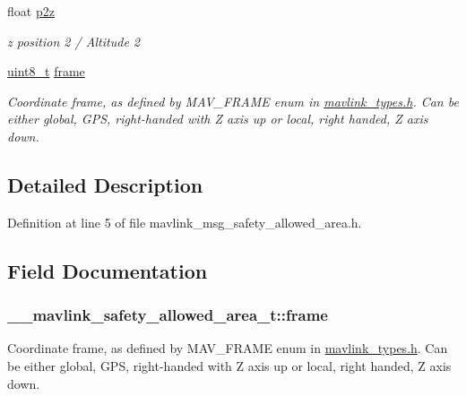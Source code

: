 \begin{DoxyCompactItemize}
float \hyperlink{struct____mavlink__safety__allowed__area__t_a9af8420ae1c69890ec5dfafd54785d91}{p2z}
\begin{DoxyCompactList}\small\item\em z position 2 / Altitude 2 \end{DoxyCompactList}\item 
\hyperlink{stdint_8h_aba7bc1797add20fe3efdf37ced1182c5}{uint8\-\_\-t} \hyperlink{struct____mavlink__safety__allowed__area__t_a8b809d2612e4c0ccb4a7d89841fa509c}{frame}
\begin{DoxyCompactList}\small\item\em Coordinate frame, as defined by M\-A\-V\-\_\-\-F\-R\-A\-M\-E enum in \hyperlink{mavlink__types_8h}{mavlink\-\_\-types.\-h}. Can be either global, G\-P\-S, right-\/handed with Z axis up or local, right handed, Z axis down. \end{DoxyCompactList}\end{DoxyCompactItemize}


\subsection{Detailed Description}


Definition at line 5 of file mavlink\-\_\-msg\-\_\-safety\-\_\-allowed\-\_\-area.\-h.



\subsection{Field Documentation}
\hypertarget{struct____mavlink__safety__allowed__area__t_a8b809d2612e4c0ccb4a7d89841fa509c}{
\subsubsection[{frame}]{ \-\_\-\-\_\-mavlink\-\_\-safety\-\_\-allowed\-\_\-area\-\_\-t\-::frame}}\label{struct____mavlink__safety__allowed__area__t_a8b809d2612e4c0ccb4a7d89841fa509c}


Coordinate frame, as defined by M\-A\-V\-\_\-\-F\-R\-A\-M\-E enum in \hyperlink{mavlink__types_8h}{mavlink\-\_\-types.\-h}. Can be either global, G\-P\-S, right-\/handed with Z axis up or local, right handed, Z axis down. 



